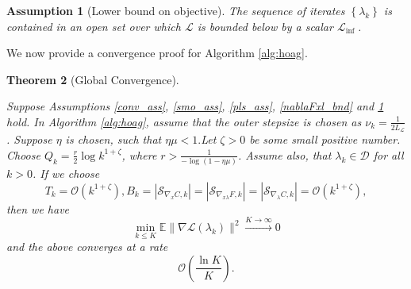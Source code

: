 \documentclass[11pt, twoside]{report}
\newtheorem{theorem}{Theorem}[section]
\newtheorem{assumption}[theorem]{Assumption}
\begin{document}
\begin{assumption}[Lower bound on objective] \label{inf_ass}
    The sequence of iterates $\left\{\lambda_k\right\}$ is contained in an open set over which $\mathcal{L}$ is bounded below by a scalar $\mathcal{L}_{\text {inf }}$.
\end{assumption}

We now provide a convergence proof for Algorithm \ref{alg:hoag}.

\begin{theorem}[Global Convergence] \label{hoag_thm_glcv}

Suppose Assumptions \ref{conv_ass}, \ref{smo_ass}, \ref{pls_ass}, \ref{nablaFxl_bnd} and \ref{inf_ass} hold.
In Algorithm \ref{alg:hoag}, assume that the outer stepsize is chosen as $\nu_k = \frac{1}{2L_\mathcal{L}}$. Suppose $\eta$ is chosen, such that $\eta \mu <1.$Let $\zeta > 0 $ be some small positive number. Choose $Q_k = \frac{r}{2}\log{k^{1+\zeta}}$, where $r > \frac{1}{-\log(1-\eta\mu)}$. Assume also, that $\lambda_k \in \mathcal{D}$ for all $k>0$.
If we choose
\begin{equation}\label{params_conv}
    T_k = \mathcal{O}(k^{1+\zeta}), B_k = |\mathcal{S}_{\nabla_x C,k}| = |\mathcal{S}_{\nabla_{x\lambda} F,k}| = |\mathcal{S}_{\nabla_\lambda C,k}| =\mathcal{O}(k^{1 +\zeta}),
\end{equation}
then we have
\[\min_{k \leq K} \mathbb{E}\|\nabla \mathcal{L}(\lambda_k)\|^2 \xrightarrow[]{K \to \infty} 0\]
 and the above converges at a rate
\[\mathcal{O} \left(\frac{\ln{K}}{K} \right).\]
\end{theorem}
\end{document}
